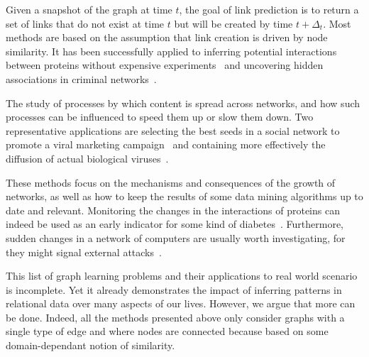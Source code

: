 \begin{description}[leftmargin=*]
  \item[link prediction~\autocite{linkPredSurvey16}] Given a snapshot of the graph at time $t$, the
    goal of link prediction is to return a set of links that do not exist at time $t$ but will be
    created by time $t+\Delta_t$. Most methods are based on the assumption that link creation is
    driven by node similarity. It has been successfully applied to inferring potential interactions
    between proteins without expensive experiments~\autocite{linkPredBio06} and uncovering hidden
    associations in criminal networks~\autocite{linkPredCrime08}.

  \item[information and influence propagation~\autocite{infmax13}] The study of processes by which
    content is spread across networks, and how such processes can be influenced to speed them up or
    slow them down. Two representative applications are selecting the best seeds in a social network
    to promote a viral marketing campaign~\autocite{infmaxKempe15} and containing more effectively
    the diffusion of actual biological viruses~\autocite{influenceBio13}.

  \item[network evolution~\autocite{networkEvolution14}] These methods focus on the mechanisms and
    consequences of the growth of networks, as well as how to keep the results of some data mining
    algorithms up to date and relevant. Monitoring the changes in the interactions of proteins
    can indeed be used as an early indicator for some kind of diabetes~\autocite{evolBio10}.
    Furthermore, sudden changes in a network of computers are usually worth investigating, for they
    might signal external attacks~\autocite{evolSecurity04}.

\end{description}

This list of graph learning problems and their applications to real world scenario is incomplete.
Yet it already demonstrates the impact of inferring patterns in relational data over many aspects of
our lives. However, we argue that more can be done. Indeed, all the methods presented above only
consider graphs with a single type of edge and where nodes are connected because based on some
domain-dependant notion of similarity.
